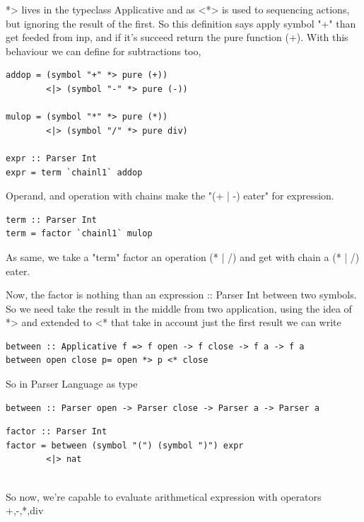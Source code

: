 \documentclass[a4papert]{article}
\begin{document}
*> lives in the typeclass Applicative and as <*> is used to sequencing actions, but ignoring the result of the first. So this definition says apply symbol "+" than get feeded from inp, and if it's succeed return the pure function (+). With this behaviour we can define for subtractions too,

\begin{lstlisting}[style=haskellstyle]
addop = (symbol "+" *> pure (+))
        <|> (symbol "-" *> pure (-))

mulop = (symbol "*" *> pure (*))
        <|> (symbol "/" *> pure div)

expr :: Parser Int
expr = term `chainl1` addop

\end{lstlisting}
Operand, and operation with chains make the "(+ | -) eater" for expression.

\begin{lstlisting}[style=haskellstyle]
term :: Parser Int
term = factor `chainl1` mulop

\end{lstlisting}
As same, we take a "term" factor an operation (* | /) and get with chain a (* | /) eater.

Now, the factor is nothing than an expression :: Parser Int between two symbols. So we need take the result in the middle from two application, using the idea of *> and extended to <* that take in account just the first result we can write

\begin{lstlisting}[style=haskellstyle]
between :: Applicative f => f open -> f close -> f a -> f a
between open close p= open *> p <* close

\end{lstlisting}
So in Parser Language as type

\begin{lstlisting}[style=haskellstyle]
between :: Parser open -> Parser close -> Parser a -> Parser a 
\end{lstlisting}
\begin{lstlisting}[style=haskellstyle]
factor :: Parser Int
factor = between (symbol "(") (symbol ")") expr
        <|> nat


\end{lstlisting}
So now, we're capable to evaluate arithmetical expression with operators +,-,*,div
\end{document}
